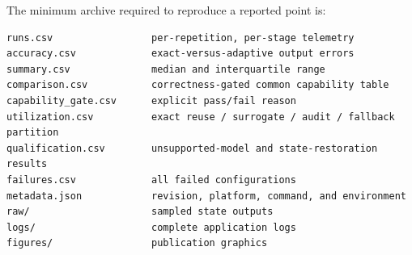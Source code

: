 \documentclass[11pt]{article}
\begin{document}
The minimum archive required to reproduce a reported point is:
\begin{lstlisting}[caption={Required result artifacts.}]
runs.csv                 per-repetition, per-stage telemetry
accuracy.csv             exact-versus-adaptive output errors
summary.csv              median and interquartile range
comparison.csv           correctness-gated common capability table
capability_gate.csv      explicit pass/fail reason
utilization.csv          exact reuse / surrogate / audit / fallback partition
qualification.csv        unsupported-model and state-restoration results
failures.csv             all failed configurations
metadata.json            revision, platform, command, and environment
raw/                     sampled state outputs
logs/                    complete application logs
figures/                 publication graphics
\end{lstlisting}
\end{document}
